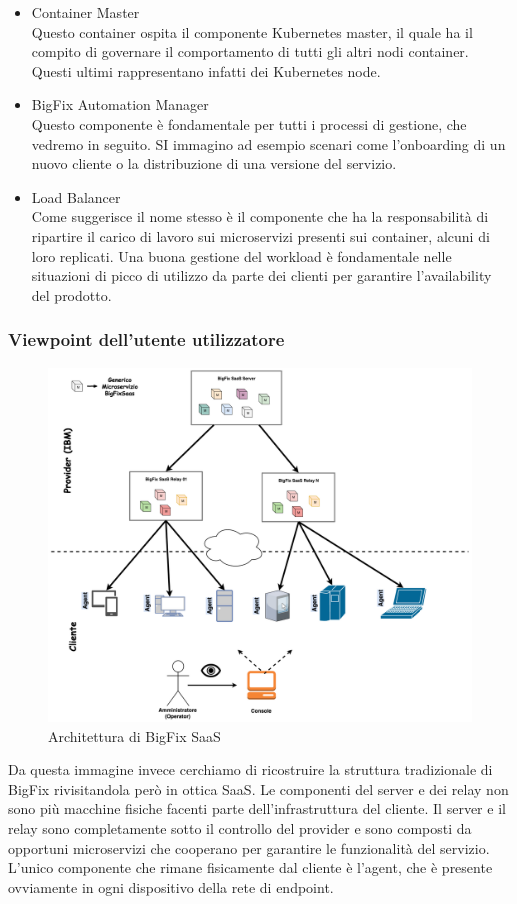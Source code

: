 \begin{itemize}
	\item Container Master \\
	Questo container ospita il componente Kubernetes master, il quale ha il compito di governare il comportamento di tutti gli altri nodi container. Questi ultimi rappresentano infatti dei Kubernetes node.
	\item BigFix Automation Manager \\
	Questo componente è fondamentale per tutti i processi di gestione, che vedremo in seguito. SI immagino ad esempio scenari come l'onboarding di un nuovo cliente o la distribuzione di una versione del servizio.
	\item Load Balancer \\
	Come suggerisce il nome stesso è il componente che ha la responsabilità di ripartire il carico di lavoro sui microservizi presenti sui container, alcuni di loro replicati. Una buona gestione del workload è fondamentale nelle situazioni di picco di utilizzo da parte dei clienti per garantire l'availability del prodotto.
\end{itemize}

\subsubsection{Viewpoint dell'utente utilizzatore}
\begin{figure} [h!]
	\centering
	\includegraphics[width=1\linewidth]{capitoli/imgs/architectureUserViewpoint.png}
	\caption{Architettura di BigFix SaaS}
	\label{fig:uviewpoint}
\end{figure}
Da questa immagine invece cerchiamo di ricostruire la struttura tradizionale di BigFix rivisitandola però in ottica SaaS. Le componenti del server e dei relay non sono più macchine fisiche facenti parte dell'infrastruttura del cliente. Il server e il relay sono completamente sotto il controllo del provider e sono composti da opportuni microservizi che cooperano per garantire le funzionalità del servizio. L'unico componente che rimane fisicamente dal cliente è l'agent, che è presente ovviamente in ogni dispositivo della rete di endpoint.

